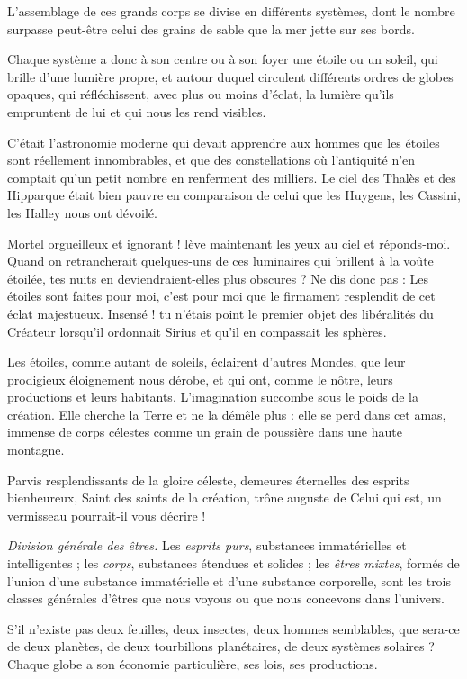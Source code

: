 \documentclass[a4paper, 11pt, oneside, landscape]{article}
\begin{document}
L'assemblage de ces grands corps se divise en différents systèmes, dont le nombre surpasse peut-être celui des grains de sable que la mer jette sur ses bords.

Chaque système a donc à son centre ou à son foyer une étoile ou un soleil, qui brille d'une lumière propre, et autour duquel circulent différents ordres de globes opaques, qui réfléchissent, avec plus ou moins d'éclat, la lumière qu'ils empruntent de lui et qui nous les rend visibles.

C'était l'astronomie moderne qui devait apprendre aux hommes que les étoiles sont réellement innombrables, et que des constellations où l'antiquité n'en comptait qu'un petit nombre en renferment des milliers. Le ciel des Thalès et des Hipparque était bien pauvre en comparaison de celui que les Huygens, les Cassini, les Halley nous ont dévoilé.

Mortel orgueilleux et ignorant ! lève maintenant les yeux au ciel et réponds-moi. Quand on retrancherait quelques-uns de ces luminaires qui brillent à la voûte étoilée, tes nuits en deviendraient-elles plus obscures ? Ne dis donc pas : Les étoiles sont faites pour moi, c'est pour moi que le firmament resplendit de cet éclat majestueux. Insensé ! tu n'étais point le premier objet des libéralités du Créateur lorsqu'il ordonnait Sirius et qu'il en compassait les sphères.

Les étoiles, comme autant de soleils, éclairent d'autres Mondes, que leur prodigieux éloignement nous dérobe, et qui ont, comme le nôtre, leurs productions et leurs habitants. L'imagination succombe sous le poids de la création. Elle cherche la Terre et ne la démêle plus : elle se perd dans cet amas, immense de corps célestes comme un grain de poussière dans une haute montagne.

Parvis resplendissants de la gloire céleste, demeures éternelles des esprits bienheureux, Saint des saints de la création, trône auguste de Celui qui est, un vermisseau pourrait-il vous décrire !

\emph{Division générale des êtres.} Les \emph{esprits purs}, substances immatérielles et intelligentes ; les \emph{corps}, substances étendues et solides ; les \emph{êtres mixtes}, formés de l'union d'une substance immatérielle et d'une substance corporelle, sont les trois classes générales d'êtres que nous voyous ou que nous concevons dans l'univers.

S'il n'existe pas deux feuilles, deux insectes, deux hommes semblables, que sera-ce de deux planètes, de deux tourbillons planétaires, de deux systèmes solaires ? Chaque globe a son économie particulière, ses lois, ses productions.
\end{document}

